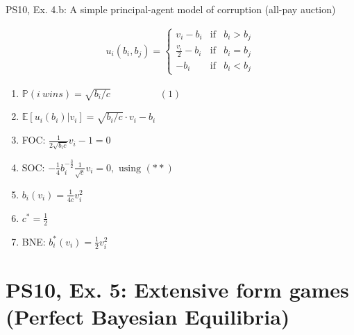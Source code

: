 \begin{frame}{PS10, Ex. 4.b: A simple principal-agent model of corruption (all-pay auction)}
\begin{multicols}{2}
\begin{align*}
        u_i(b_i,b_j)=\left\{\begin{array}{lcl}
          v_i-b_i           & \text{if} & b_i>b_j \\
          \frac{v_i}{2}-b_i & \text{if} & b_i=b_j \\
          -b_i              & \text{if} & b_i<b_j
        \end{array}\right.
      \end{align*} \vspace{-16pt}
      \begin{enumerate}
        \item $\mathbb{P}(i\ wins)=\sqrt{b_i/c}\quad\quad\quad\quad\quad(1)$
        \item $\mathbb{E}[u_i(b_i)|v_i]=\sqrt{b_i/c}\cdot v_i-b_i$
        \item FOC: $\frac{1}{2\sqrt{b_ic}}v_i-1=0$
        \item[] SOC: $-\frac{1}{4}b_i^{-\frac{3}{2}}\frac{1}{\sqrt{c}}v_i=0,\text{ using }(**)$
        \item $b_i(v_i)=\frac{1}{4c}v_i^2$
        \item $c^*=\frac{1}{2}$
        \item BNE: $b_i^*(v_i)=\frac{1}{2}v_i^2$
      \end{enumerate}
      \vfill\null
    \end{multicols}
\end{frame}



\section{PS10, Ex. 5: Extensive form games (Perfect Bayesian Equilibria)}

